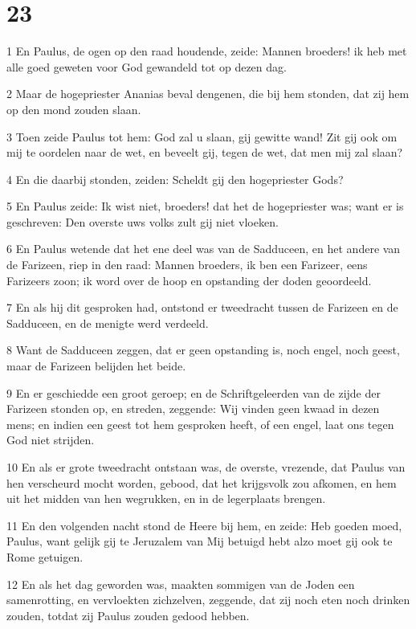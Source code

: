 \chapter{23}

\par 1 En Paulus, de ogen op den raad houdende, zeide: Mannen broeders! ik heb met alle goed geweten voor God gewandeld tot op dezen dag.
\par 2 Maar de hogepriester Ananias beval dengenen, die bij hem stonden, dat zij hem op den mond zouden slaan.
\par 3 Toen zeide Paulus tot hem: God zal u slaan, gij gewitte wand! Zit gij ook om mij te oordelen naar de wet, en beveelt gij, tegen de wet, dat men mij zal slaan?
\par 4 En die daarbij stonden, zeiden: Scheldt gij den hogepriester Gods?
\par 5 En Paulus zeide: Ik wist niet, broeders! dat het de hogepriester was; want er is geschreven: Den overste uws volks zult gij niet vloeken.
\par 6 En Paulus wetende dat het ene deel was van de Sadduceen, en het andere van de Farizeen, riep in den raad: Mannen broeders, ik ben een Farizeer, eens Farizeers zoon; ik word over de hoop en opstanding der doden geoordeeld.
\par 7 En als hij dit gesproken had, ontstond er tweedracht tussen de Farizeen en de Sadduceen, en de menigte werd verdeeld.
\par 8 Want de Sadduceen zeggen, dat er geen opstanding is, noch engel, noch geest, maar de Farizeen belijden het beide.
\par 9 En er geschiedde een groot geroep; en de Schriftgeleerden van de zijde der Farizeen stonden op, en streden, zeggende: Wij vinden geen kwaad in dezen mens; en indien een geest tot hem gesproken heeft, of een engel, laat ons tegen God niet strijden.
\par 10 En als er grote tweedracht ontstaan was, de overste, vrezende, dat Paulus van hen verscheurd mocht worden, gebood, dat het krijgsvolk zou afkomen, en hem uit het midden van hen wegrukken, en in de legerplaats brengen.
\par 11 En den volgenden nacht stond de Heere bij hem, en zeide: Heb goeden moed, Paulus, want gelijk gij te Jeruzalem van Mij betuigd hebt alzo moet gij ook te Rome getuigen.
\par 12 En als het dag geworden was, maakten sommigen van de Joden een samenrotting, en vervloekten zichzelven, zeggende, dat zij noch eten noch drinken zouden, totdat zij Paulus zouden gedood hebben.
